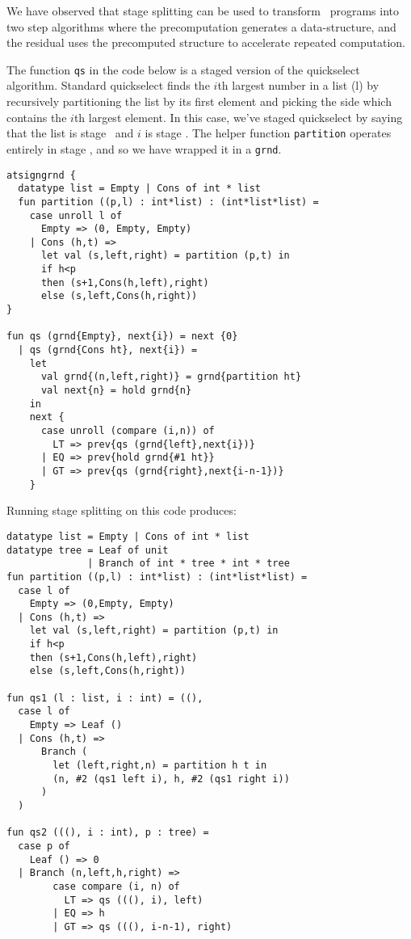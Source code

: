 We have observed that stage splitting can be used to transform \lang\ programs into two step algorithms where the precomputation generates a data-structure, and the residual uses the precomputed structure to accelerate repeated computation.  

The function {\tt qs} in the code below is a staged version of the quickselect algorithm.
Standard quickselect finds the $i$th largest number in a list (l) by recursively partitioning the list by its 
first element and picking the side which contains the $i$th largest element.
In this case, we've staged quickselect by saying that the list is stage \bbone\ and $i$ is stage \bbtwo.
The helper function {\tt partition} operates entirely in stage \bbone, and so we have wrapped it in a \texttt{grnd}.

\begin{lstlisting} 
atsigngrnd { 
  datatype list = Empty | Cons of int * list
  fun partition ((p,l) : int*list) : (int*list*list) = 
    case unroll l of 
      Empty => (0, Empty, Empty) 
    | Cons (h,t) => 
      let val (s,left,right) = partition (p,t) in 
      if h<p 
      then (s+1,Cons(h,left),right) 
      else (s,left,Cons(h,right))
}

fun qs (grnd{Empty}, next{i}) = next {0} 
  | qs (grnd{Cons ht}, next{i}) =
    let 
      val grnd{(n,left,right)} = grnd{partition ht}
      val next{n} = hold grnd{n}
    in
    next { 
      case unroll (compare (i,n)) of
        LT => prev{qs (grnd{left},next{i})}
      | EQ => prev{hold grnd{#1 ht}}
      | GT => prev{qs (grnd{right},next{i-n-1})}
    }
\end{lstlisting}

\noindent
Running stage splitting on this code produces:

\begin{lstlisting} 
datatype list = Empty | Cons of int * list
datatype tree = Leaf of unit 
              | Branch of int * tree * int * tree
fun partition ((p,l) : int*list) : (int*list*list) = 
  case l of 
    Empty => (0,Empty, Empty) 
  | Cons (h,t) => 
    let val (s,left,right) = partition (p,t) in 
    if h<p 
    then (s+1,Cons(h,left),right) 
    else (s,left,Cons(h,right))

fun qs1 (l : list, i : int) = ((), 
  case l of
    Empty => Leaf ()
  | Cons (h,t) => 
      Branch (
        let (left,right,n) = partition h t in
        (n, #2 (qs1 left i), h, #2 (qs1 right i))
      )
  )

fun qs2 (((), i : int), p : tree) = 
  case p of
    Leaf () => 0
  | Branch (n,left,h,right) =>
        case compare (i, n) of 
          LT => qs (((), i), left) 
        | EQ => h 
        | GT => qs (((), i-n-1), right)

\end{lstlisting}

